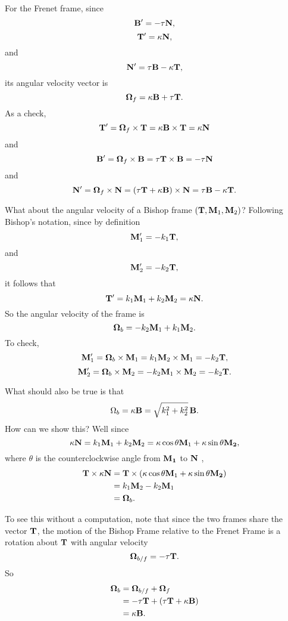 \documentclass{ximera}
\begin{document}
For the Frenet frame, since
\[
      {\bf B}^\prime = -\tau {\bf N} ,
\]
\[
   {\bf T}^\prime = \kappa {\bf N},
\]
and
\[
   {\bf N}^\prime = \tau {\bf B} -\kappa {\bf T}  ,
\]
its angular velocity vector is 
\[
  \boldsymbol{\Omega}_f =   \kappa {\bf B} + \tau {\bf T}  .
\]
As a check, 
\[
    {\bf T}^\prime =    \boldsymbol{\Omega}_f \times {\bf T} = \kappa {\bf B} \times {\bf T} = \kappa {\bf N} 
\]
and 
\[
    {\bf B}^\prime =    \boldsymbol{\Omega}_f \times {\bf B} = \tau {\bf T} \times {\bf B} = - \tau {\bf N} 
\]
and
\[
    {\bf N}^\prime =    \boldsymbol{\Omega}_f \times {\bf N} =  (\tau {\bf T} + \kappa {\bf B})\times {\bf N} = \tau {\bf B}-\kappa{\bf T} .
\]

What about the angular velocity of a Bishop frame $({\bf T}, {\bf M}_1, {\bf M}_2)$? Following Bishop's notation, since by definition
\[
     {\bf M}_1^\prime = -k_1 {\bf T} , 
\]
and
\[
   {\bf M}_2^\prime = -k_2 {\bf T} , 
\]
it follows that
\[
   {\bf T}^\prime  = k_1 {\bf M}_1 + k_2 {\bf M}_2 = \kappa {\bf N} .
\]
So the angular velocity of the frame is
\[
  \boldsymbol{\Omega}_b = -k_2 {\bf M}_1 + k_1{\bf M}_2 .
\]
To check,
\[
    {\bf M}_1^\prime = \boldsymbol{\Omega}_b \times {\bf M}_1 = k_1 {\bf M}_2 \times {\bf M}_1 = - k_2 {\bf T} ,
\]
\[
    {\bf M}_2^\prime = \boldsymbol{\Omega}_b \times {\bf M}_2 = -k_2 {\bf M}_1 \times {\bf M}_2 = - k_2 {\bf T}.
\]

What should also be true is that
\[
        \Omega_b = \kappa {\bf B} = \sqrt{k_1^2 + k_2^2} \, {\bf B} .
\]
How can we show this? Well since
\[
   \kappa {\bf N} =  k_1 {\bf M}_1 + k_2 {\bf M}_2 = \kappa \cos \theta {\bf M}_1 + \kappa \sin\theta {\bf M_2} ,
\]
where $\theta$ is the counterclockwise angle from ${\bf M_1}$ to ${\bf N}$ ,
\begin{align*}
     {\bf T}\times \kappa {\bf N} &= {\bf T} \times  (  \kappa \cos \theta {\bf M}_1 + \kappa \sin\theta {\bf M_2}   ) \\
                                   &= k_1 {\bf M}_2 - k_2 {\bf M}_1 \\
                                   &= \boldsymbol{\Omega}_b.
\end{align*}

To see this without a computation, note that since the two frames share the vector ${\bf T}$, the motion of the Bishop Frame relative to the Frenet Frame is a rotation about ${\bf T}$ with angular velocity
\[
      \boldsymbol{\Omega}_{b/f} = -\tau {\bf T}.
\]
So
\begin{align*}
        \boldsymbol{\Omega}_{b} &= \boldsymbol{\Omega}_{b/f}  + \boldsymbol{\Omega}_f   \\
                                                &=     -\tau {\bf T} + (\tau {\bf T} + \kappa {\bf B})  \\
                                                &= \kappa {\bf B} .        
\end{align*}
\end{document}

